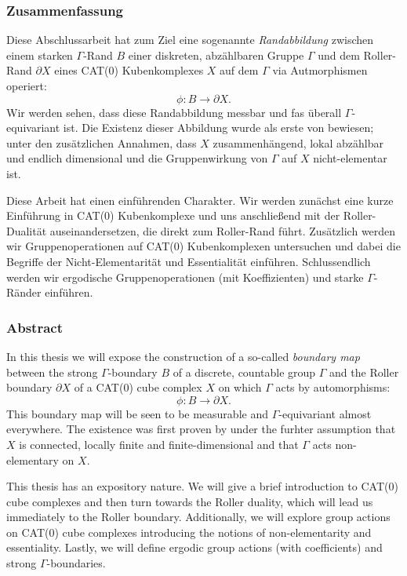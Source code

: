 
\subsubsection*{Zusammenfassung}
%
\label{sec:Zusammenfassung}
Diese Abschlussarbeit hat zum Ziel eine sogenannte \emph{Randabbildung} zwischen einem starken \(\Gamma\)-Rand \(B\) einer diskreten, abzählbaren Gruppe \(\Gamma\) und dem Roller-Rand \(\partial X\) eines CAT(0) Kubenkomplexes \(X\) auf dem \(\Gamma\) via Autmorphismen operiert:
\[
  \phi\colon B \to \partial X.
\]
Wir werden sehen, dass diese Randabbildung messbar und fas überall \(\Gamma\)-equivariant ist. Die Existenz dieser Abbildung wurde als erste von \textcite{MR3509968} bewiesen; unter den zusätzlichen Annahmen, dass \(X\) zusammenhängend, lokal abzählbar und endlich dimensional und die Gruppenwirkung von \(\Gamma\) auf \(X\) nicht-elementar ist.

Diese Arbeit hat einen einführenden Charakter. Wir werden zunächst eine kurze Einführung in CAT(0) Kubenkomplexe und uns anschließend mit der Roller-Dualität auseinandersetzen, die direkt zum Roller-Rand führt. Zusätzlich werden wir Gruppenoperationen auf CAT(0) Kubenkomplexen untersuchen und dabei die Begriffe der Nicht-Elementarität und Essentialität einführen. Schlussendlich werden wir ergodische Gruppenoperationen (mit Koeffizienten) und starke \(\Gamma\)-Ränder einführen.


\subsubsection*{Abstract}
\label{sec:abstract}

In this thesis we will expose the construction of a so-called \emph{boundary map} between the strong \(\Gamma\)-boundary \(B\) of a discrete, countable group \(\Gamma\) and the Roller boundary \(\partial X\) of a CAT(0) cube complex \(X\) on which \(\Gamma\) acts by automorphisms:
\[
  \phi\colon B \to \partial X.
\]
This boundary map will be seen to be measurable and \(\Gamma\)-equivariant almost everywhere. The existence was first proven by \textcite{MR3509968} under the furhter assumption that \(X\) is connected, locally finite and finite-dimensional and that \(\Gamma\) acts non-elementary on \(X\). 

This thesis has an expository nature. We will give a brief introduction to CAT(0) cube complexes and then turn towards the Roller duality, which will lead us immediately to the Roller boundary. Additionally, we will explore group actions on CAT(0) cube complexes introducing the notions of non-elementarity and essentiality. Lastly, we will define ergodic group actions (with coefficients) and strong \(\Gamma\)-boundaries.

